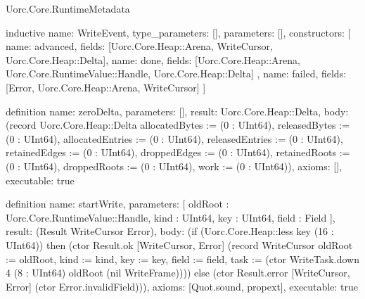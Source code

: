 \begin{lexlean}{Uorc.Core.RuntimeMetadata}
\begin{semanticmodule}
inductive{
  name: WriteEvent,
  type_parameters: [],
  parameters: [],
  constructors: [
    {name: advanced, fields: [Uorc.Core.Heap::Arena, WriteCursor, Uorc.Core.Heap::Delta]},
    {
      name: done,
      fields: [Uorc.Core.Heap::Arena, Uorc.Core.RuntimeValue::Handle, Uorc.Core.Heap::Delta]
    },
    {name: failed, fields: [Error, Uorc.Core.Heap::Arena, WriteCursor]}
  ]
}

definition{
  name: zeroDelta,
  parameters: [],
  result: Uorc.Core.Heap::Delta,
  body: (record Uorc.Core.Heap::Delta {allocatedBytes := (0 : UInt64), releasedBytes := (0 : UInt64), allocatedEntries := (0 : UInt64), releasedEntries := (0 : UInt64), retainedEdges := (0 : UInt64), droppedEdges := (0 : UInt64), retainedRoots := (0 : UInt64), droppedRoots := (0 : UInt64), work := (0 : UInt64)}),
  axioms: [],
  executable: true
}

definition{
  name: startWrite,
  parameters: [
    oldRoot : Uorc.Core.RuntimeValue::Handle,
    kind : UInt64,
    key : UInt64,
    field : Field
  ],
  result: (Result WriteCursor Error),
  body: (if (Uorc.Core.Heap::less key (16 : UInt64)) then (ctor Result.ok [WriteCursor, Error] (record WriteCursor {oldRoot := oldRoot, kind := kind, key := key, field := field, task := (ctor WriteTask.down 4 (8 : UInt64) oldRoot (nil WriteFrame))})) else (ctor Result.error [WriteCursor, Error] (ctor Error.invalidField))),
  axioms: [Quot.sound, propext],
  executable: true
}


\end{semanticmodule}
\end{lexlean}
